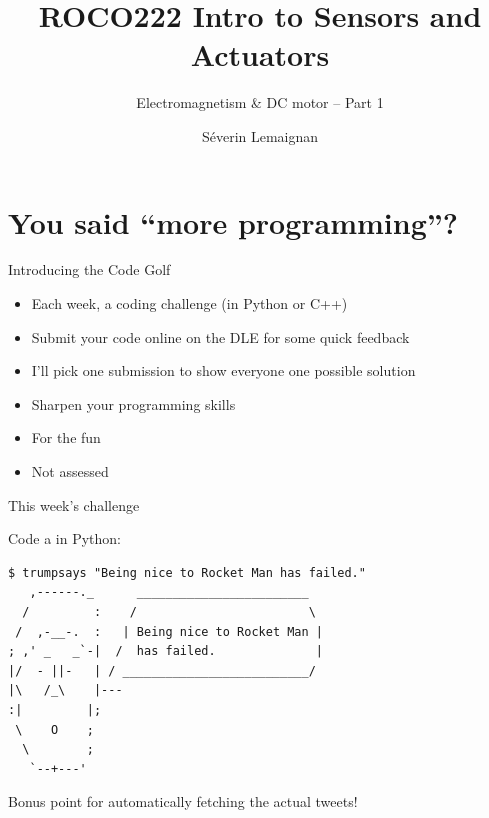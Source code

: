 \documentclass[compress]{beamer}
\title{ROCO222 \newline Intro to Sensors and Actuators}
\subtitle{Electromagnetism \& DC motor -- Part 1}
\date{}
\author{Séverin Lemaignan}
\institute{Centre for Robotics and Neural Systems\\{\bf Plymouth University}}
\makeatletter
\def\beamer@writeslidentry@miniframesoff{%
  \expandafter\beamer@ifempty\expandafter{\beamer@framestartpage}{}%
  {%
    \clearpage\beamer@notesactions%
  }
}
\newcommand*{\miniframesoff}{\let\beamer@writeslidentry=\beamer@writeslidentry@miniframesoff}
\makeatother
\begin{document}



\maketitle

\miniframesoff
\section[]{You said ``more programming''?}

\begin{frame}{Introducing the Code Golf}

    \begin{itemize}
        \item Each week, a coding challenge (in Python or C++)
        \item Submit your code online on the DLE for some quick feedback
        \item I'll pick one submission to show everyone one possible solution
    \end{itemize}

    \begin{itemize}
        \item Sharpen your programming skills
        \item For the fun
        \item Not assessed
    \end{itemize}

\end{frame}

\begin{frame}[fragile]{This week's challenge}

Code a  in Python:

\begin{verbatim}
$ trumpsays "Being nice to Rocket Man has failed."
   ,------._      ________________________
  /         :    /                        \
 /  ,-__-.  :   | Being nice to Rocket Man |
; ,' _   _`-|  /  has failed.              |
|/  - ||-   | / __________________________/
|\   /_\    |---
:|         |;
 \    O    ;
  \        ;
   `--+---'
\end{verbatim}

Bonus point for automatically fetching the actual tweets!

\end{frame}
\end{document}
